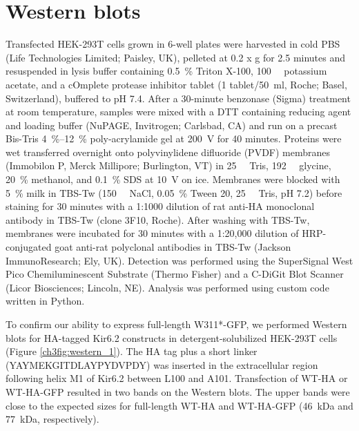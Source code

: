 \section{Western blots}
Transfected HEK-293T cells grown in 6-well plates were harvested in cold PBS (Life Technologies Limited; Paisley, UK), pelleted at 0.2 x g for 2.5 minutes and resuspended in lysis buffer containing \SI{0.5}{\percent} Triton X-100, \SI{100}{\milli\Molar} potassium acetate, and a cOmplete protease inhibitor tablet (1 tablet/\SI{50}{\milli\litre}, Roche; Basel, Switzerland), buffered to pH 7.4.
After a 30-minute benzonase (Sigma) treatment at room temperature, samples were mixed with a DTT containing reducing agent and loading buffer (NuPAGE, Invitrogen; Carlsbad, CA) and run on a precast Bis-Tris \SIrange{4}{12}{\percent} poly-acrylamide gel at \SI{200}{\volt} for 40 minutes.
Proteins were wet transferred overnight onto polyvinylidene difluoride (PVDF) membranes (Immobilon P, Merck Millipore; Burlington, VT) in \SI{25}{\milli\Molar} Tris, \SI{192}{\milli\Molar} glycine, \SI{20}{\percent} methanol, and \SI{0.1}{\percent} SDS at \SI{10}{\volt} on ice.
Membranes were blocked with \SI{5}{\percent} milk in TBS-Tw (\SI{150}{\milli\Molar} NaCl, \SI{0.05}{\percent} Tween 20, \SI{25}{\milli\Molar} Tris, pH 7.2) before staining for 30 minutes with a 1:1000 dilution of rat anti-HA monoclonal antibody in TBS-Tw (clone 3F10, Roche).
After washing with TBS-Tw, membranes were incubated for 30 minutes with a 1:20,000 dilution of HRP-conjugated goat anti-rat polyclonal antibodies in TBS-Tw (Jackson ImmunoResearch; Ely, UK).
Detection was performed using the SuperSignal West Pico Chemiluminescent Substrate (Thermo Fisher) and a C-DiGit Blot Scanner (Licor Biosciences; Lincoln, NE).
Analysis was performed using custom code written in Python.

To confirm our ability to express full-length W311*-GFP, we performed Western blots for HA-tagged Kir6.2 constructs in detergent-solubilized HEK-293T cells (Figure \ref{ch3fig:western_1}).
The HA tag plus a short linker (YAYMEKGITDLAYPYDVPDY) was inserted in the extracellular region following helix M1 of Kir6.2 between L100 and A101.
Transfection of WT-HA or WT-HA-GFP resulted in two bands on the Western blots.
The upper bands were close to the expected sizes for full-length WT-HA and WT-HA-GFP (\SI{46}{\kilo\dalton} and \SI{77}{\kilo\dalton}, respectively).

